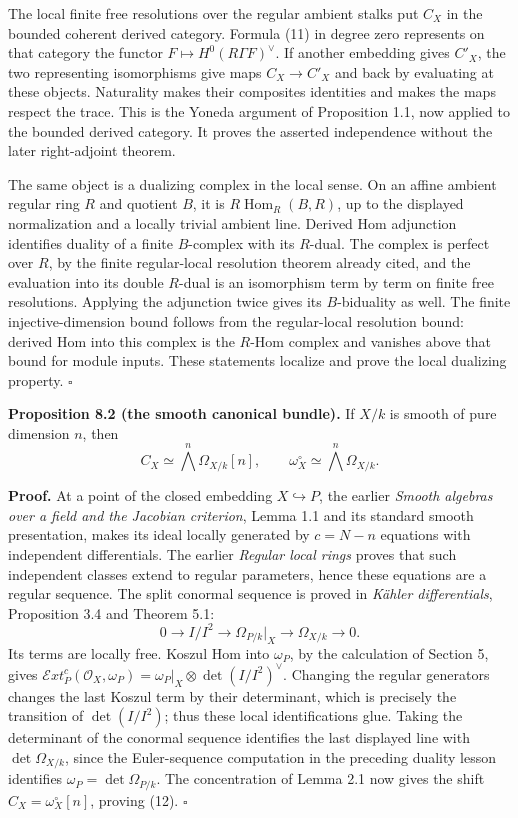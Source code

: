 \documentclass[11pt]{article}
\begin{document}
The local finite free resolutions over the regular ambient stalks put
\(C_X\) in the bounded coherent derived category. Formula (11) in degree
zero represents on that category the functor
\(F\mapsto H^0(R\Gamma F)^\vee\). If another embedding gives \(C'_X\),
the two representing isomorphisms give maps \(C_X\to C'_X\) and back by
evaluating at these objects. Naturality makes their composites
identities and makes the maps respect the trace. This is the Yoneda
argument of Proposition 1.1, now applied to the bounded derived
category. It proves the asserted independence without the later
right-adjoint theorem.

The same object is a dualizing complex in the local sense. On an affine
ambient regular ring \(R\) and quotient \(B\), it is
\(R\operatorname{Hom}_R(B,R)\), up to the displayed normalization and a
locally trivial ambient line. Derived Hom adjunction identifies duality
of a finite \(B\)-complex with its \(R\)-dual. The complex is perfect
over \(R\), by the finite regular-local resolution theorem already
cited, and the evaluation into its double \(R\)-dual is an isomorphism
term by term on finite free resolutions. Applying the adjunction twice
gives its \(B\)-biduality as well. The finite injective-dimension bound
follows from the regular-local resolution bound: derived Hom into this
complex is the \(R\)-Hom complex and vanishes above that bound for
module inputs. These statements localize and prove the local dualizing
property. \(\square\)

\textbf{Proposition 8.2 (the smooth canonical bundle).} If \(X/k\) is
smooth of pure dimension \(n\), then \[
C_X\simeq\bigwedge^n\Omega_{X/k}[n],
\qquad \omega_X^\circ\simeq\bigwedge^n\Omega_{X/k}.
\tag{12}
\]

\textbf{Proof.} At a point of the closed embedding
\(X\hookrightarrow P\), the earlier \emph{Smooth algebras over a field
and the Jacobian criterion}, Lemma 1.1 and its standard smooth
presentation, makes its ideal locally generated by \(c=N-n\) equations
with independent differentials. The earlier \emph{Regular local rings}
proves that such independent classes extend to regular parameters, hence
these equations are a regular sequence. The split conormal sequence is
proved in \emph{Kähler differentials}, Proposition 3.4 and Theorem 5.1:
\[
0\to I/I^2\to\Omega_{P/k}|_X\to\Omega_{X/k}\to0.
\] Its terms are locally free. Koszul Hom into \(\omega_P\), by the
calculation of Section 5, gives
\(\mathcal Ext^c_P(\mathcal O_X,\omega_P)=
\omega_P|_X\otimes\det(I/I^2)^\vee\). Changing the regular generators
changes the last Koszul term by their determinant, which is precisely
the transition of \(\det(I/I^2)\); thus these local identifications
glue. Taking the determinant of the conormal sequence identifies the
last displayed line with \(\det\Omega_{X/k}\), since the Euler-sequence
computation in the preceding duality lesson identifies
\(\omega_P=\det\Omega_{P/k}\). The concentration of Lemma 2.1 now gives
the shift \(C_X=\omega_X^\circ[n]\), proving (12). \(\square\)
\end{document}
